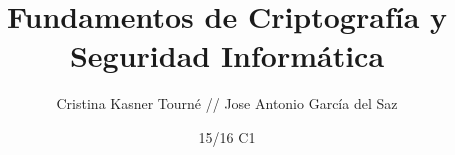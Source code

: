 \documentclass[nochap]{apuntes}
\title{Fundamentos de Criptografía y Seguridad Informática}
\author{Cristina Kasner Tourné // Jose Antonio García del Saz}
\date{15/16 C1}
\begin{document}
\pagestyle{plain}
\maketitle

\tableofcontents
\newpage



\appendix



\newpage
\begin{thebibliography}{}
	

	
\end{thebibliography}

\printindex
\end{document}
